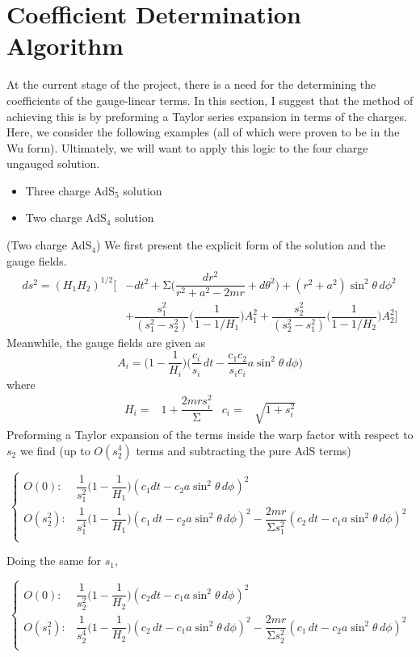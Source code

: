 \section{Coefficient Determination Algorithm}
At the current stage of the project, there is a need for the determining the coefficients of the gauge-linear terms. In this section, I suggest that the method of achieving this is by preforming a Taylor series expansion in terms of the charges. Here, we consider the following examples (all of which were proven to be in the Wu form). Ultimately, we will want to apply this logic to the four charge ungauged solution.
\begin{itemize}
	\item[(i)] Three charge AdS$_5$ solution
	\item[(ii)] Two charge AdS$_4$ solution
\end{itemize}
\begin{ex}
(Two charge AdS$_4$) We first present the explicit form of the solution and the gauge fields.
\[\begin{align*}
	ds^2=(H_1H_2)^{1/2}\Big[&-dt^2+\mathrm{\mathrm{\Sigma} }\Big(\dfrac{dr^2}{r^2+a^2-2mr}+d\theta ^2\Big)+(r^2+a^2)\sin ^2\theta \,d\phi ^2\\
	&+\dfrac{s_1^2}{(s_1^2-s_2^2)}\Big(\dfrac{1}{1-1/H_1}\Big)A_1^2+\dfrac{s_2^2}{(s_2^2-s_1^2)}\Big(\dfrac{1}{1-1/H_2}\Big)A_2^2\Big]
\end{align*}\]
Meanwhile, the gauge fields are given as
\[A_{i}=\Big(1-\dfrac{1}{H_i}\Big)\Big(\dfrac{c_i}{s_{i}}\,dt-\dfrac{c_1c_2}{s_{i}c_{i}}a\sin ^2\theta \,d\phi \Big)\]
where
\[\begin{align*}
	H_{i}=&1+\dfrac{2mrs_{i}^2}{\mathrm{\Sigma} }&c_{i}=&\sqrt{1+s_{i}^2}
\end{align*}\]
Preforming a Taylor expansion of the terms inside the warp factor with respect to $s_2$ we find (up to $O(s_2^4)$ terms and subtracting the pure AdS terms)

\[\begin{cases}
	O(0):&\dfrac{1}{s_1^2}\Big(1-\dfrac{1}{H_1}\Big)(c_1dt-c_2a\sin ^2\theta\,d\phi )^2\\
	O(s_2^2):&\dfrac{1}{s_1^{4}}\Big(1-\dfrac{1}{H_1}\Big)(c_1\,dt-c_2a\sin ^2\theta \,d\phi )^2-\dfrac{2mr}{\mathrm{\Sigma} s_1^2}(c_2\,dt-c_1a\sin ^2\theta \,d\phi )^2\\
\end{cases}\]

Doing the same for $s_1$, 

\[\begin{cases}
	O(0):&\dfrac{1}{s_2^2}\Big(1-\dfrac{1}{H_2}\Big)(c_2dt-c_1a\sin ^2\theta\,d\phi )^2\\
	O(s_1^2):&\dfrac{1}{s_2^{4}}\Big(1-\dfrac{1}{H_2}\Big)(c_2\,dt-c_1a\sin ^2\theta \,d\phi )^2-\dfrac{2mr}{\mathrm{\Sigma} s_2^2}(c_1\,dt-c_2a\sin ^2\theta \,d\phi )^2\\
\end{cases}\]

\end{ex}
